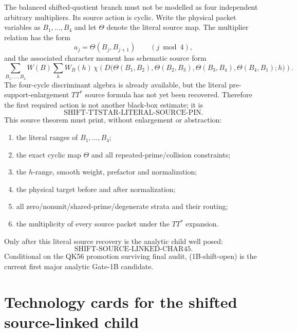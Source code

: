 \documentclass[11pt]{article}
\theoremstyle{definition}
\theoremstyle{remark}
\newcommand{\1}{\mathbf 1}
\begin{document}
The balanced shifted-quotient branch must not be modelled as four independent arbitrary multipliers.  Its
source action is cyclic.  Write the physical packet variables as $B_1,\ldots,B_4$ and let $\Theta$ denote the
literal source map.  The multiplier relation has the form
\[
 \boxed{a_j=\Theta(B_j,B_{j+1})\qquad(j\bmod 4),}
\tag{1B-shift-cycle}
\]
and the associated character moment has schematic source form
\[
 \boxed{
 \sum_{B_1,\ldots,B_4}W(B)
 \sum_h W_B(h)\,
 \chi\!\left(
 D\bigl(\Theta(B_1,B_2),\Theta(B_2,B_3),
        \Theta(B_3,B_4),\Theta(B_4,B_1);h\bigr)
 \right).}
\tag{1B-shift-moment}
\]
The four-cycle discriminant algebra is already available, but the literal pre-support-enlargement $TT^*$ source
formula has not yet been recovered.  Therefore the first required action is not another black-box estimate; it is
\[
 \boxed{\mathrm{SHIFT\!\mbox{-}TTSTAR\!\mbox{-}LITERAL\!\mbox{-}SOURCE\!\mbox{-}PIN}.}
\tag{1B-shift-source-pin}
\]
This source theorem must print, without enlargement or abstraction:
\begin{enumerate}[label=(\alph*)]
\item the literal ranges of $B_1,\ldots,B_4$;
\item the exact cyclic map $\Theta$ and all repeated-prime/collision constraints;
\item the $h$-range, smooth weight, prefactor and normalization;
\item the physical target before and after normalization;
\item all zero/nonunit/shared-prime/degenerate strata and their routing;
\item the multiplicity of every source packet under the $TT^*$ expansion.
\end{enumerate}
Only after this literal source recovery is the analytic child well posed:
\[
 \boxed{\mathrm{SHIFT\!\mbox{-}SOURCE\!\mbox{-}LINKED\!\mbox{-}CHAR45}.}
\tag{1B-shift-open}
\]
Conditional on the QK56 promotion surviving final audit, (1B-shift-open) is the current first major analytic
Gate-1B candidate.

\section{Technology cards for the shifted source-linked child}
\label{sec:g1b-shift-tech}
\end{document}
